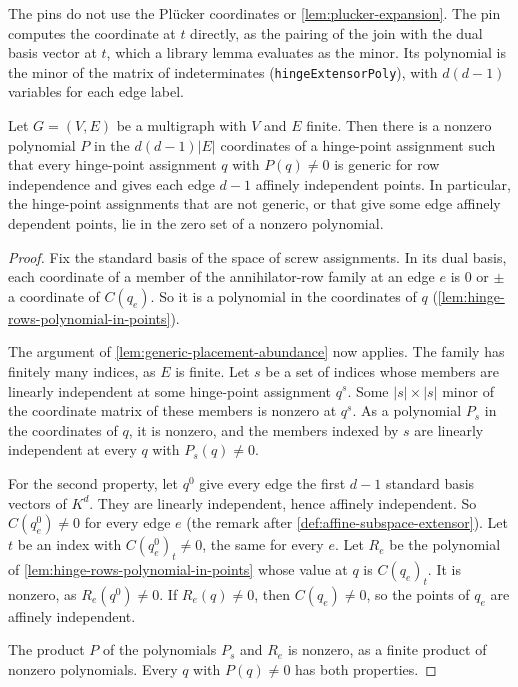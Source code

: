 \begin{fmlnote}
  The pins do not use the Pl\"ucker coordinates or
  \cref{lem:plucker-expansion}. The pin computes the coordinate
  at $t$ directly, as the pairing of the join with the dual basis vector
  at $t$, which a library lemma evaluates as the minor. Its polynomial is
  the minor of the matrix of indeterminates
  (\texttt{hingeExtensorPoly}), with $d(d-1)$ variables for each edge
  label.
\end{fmlnote}

\begin{lemma}
  \label{lem:generic-hinge-points-abundance}
  \leanok
  Let $G = (V, E)$ be a multigraph with $V$ and $E$ finite. Then there
  is a nonzero polynomial $P$ in the $d(d-1)|E|$ coordinates of a
  hinge-point assignment such that every hinge-point assignment $q$
  with $P(q) \neq 0$ is generic for row independence and gives each
  edge $d - 1$ affinely independent points. In particular, the
  hinge-point assignments that are not generic, or that give some edge
  affinely dependent points, lie in the zero set of a nonzero
  polynomial.
\end{lemma}
\begin{proof}
  \leanok
  Fix the standard basis of the space of screw assignments. In its
  dual basis, each coordinate of a member of the annihilator-row
  family at an edge $e$ is $0$ or $\pm$ a coordinate of $C(q_e)$. So
  it is a polynomial in the coordinates of $q$
  (\cref{lem:hinge-rows-polynomial-in-points}).

  The argument of \cref{lem:generic-placement-abundance} now applies.
  The family has finitely many indices, as $E$ is finite. Let $s$ be a
  set of indices whose members are linearly independent at some
  hinge-point assignment $q^s$. Some $|s| \times |s|$ minor of the
  coordinate matrix of these members is nonzero at $q^s$. As a
  polynomial $P_s$ in the coordinates of $q$, it is nonzero, and the
  members indexed by $s$ are linearly independent at every $q$ with
  $P_s(q) \neq 0$.

  For the second property, let $q^0$ give every edge the first $d - 1$
  standard basis vectors of $K^d$. They are linearly independent, hence
  affinely independent. So $C(q^0_e) \neq 0$ for every edge $e$ (the
  remark after \cref{def:affine-subspace-extensor}). Let $t$ be an
  index with $C(q^0_e)_t \neq 0$, the same for every $e$. Let $R_e$ be
  the polynomial of \cref{lem:hinge-rows-polynomial-in-points} whose
  value at $q$ is $C(q_e)_t$. It is nonzero, as $R_e(q^0) \neq 0$. If
  $R_e(q) \neq 0$, then $C(q_e) \neq 0$, so the points of $q_e$ are
  affinely independent.

  The product $P$ of the polynomials $P_s$ and $R_e$ is nonzero, as a
  finite product of nonzero polynomials. Every $q$ with $P(q) \neq 0$
  has both properties.
\end{proof}

